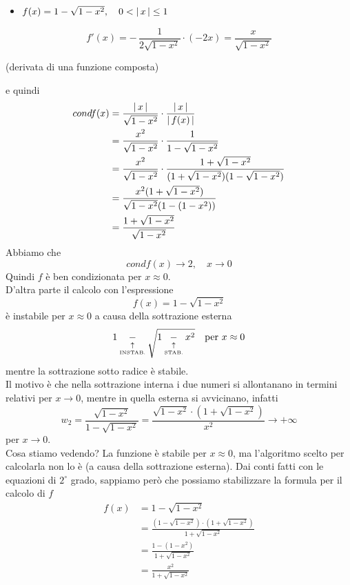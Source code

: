 \documentclass[12pt]{article}
\DeclarePairedDelimiter{\abs}{\lvert}{\rvert}
\begin{document}
\begin{itemize} %
    \item $f(x) = 1-\sqrt{1-x^2}, \quad 0 < \abs{\,x\,} \le 1$\\
\end{itemize}
\[ f'(x) = -\,\frac{1}{2\sqrt{1-x^2}} \cdot (-2x) = \frac{x}{\sqrt{1-x^2}} \]
\begin{center}
    (derivata di una funzione composta)
\end{center}
e quindi
\[ \begin{split}
        condf(x) & = \frac{\abs{\,x\,}}{\sqrt{1-x^2}} \cdot \frac{\abs{\,x\,}}{\abs{\,f(x)\,}} \\
        & = \frac{x^2}{\sqrt{1-x^2}} \cdot \frac{1}{1-\sqrt{1-x^2}} \\
        & = \frac{x^2}{\sqrt{1-x^2}}\cdot \frac{1 + \sqrt{1-x^2}}{(1 + \sqrt{1-x^2})(1 - \sqrt{1-x^2})}\\
        & = \frac{x^2(1+\sqrt{1-x^2})}{\sqrt{1-x^2}(1-(1-x^2))} \\
        & = \frac{1+\sqrt{1-x^2}}{\sqrt{1-x^2}} \\
    \end{split} \]
Abbiamo che
\[ condf(x)\rightarrow2, \quad x\rightarrow0 \]
Quindi $f$ è ben condizionata per $x\approx0$.\\ 
D'altra parte il calcolo con l'espressione
\[ f(x)=1-\sqrt{1-x^2} \]
è instabile per $x\approx 0$ a causa della sottrazione esterna 
\[1 \underset{\underset{\text{\tiny{INSTAB.}}}{\uparrow}}{-} \sqrt{1 \underset{\underset{\text{\tiny{STAB.}}}{\uparrow}}{-} x^2} \quad \text{per } x \approx 0\]
mentre la sottrazione sotto radice è stabile.\\
Il motivo è che nella sottrazione interna i due numeri si allontanano in termini relativi per $x \to 0$, mentre in quella esterna si avvicinano, infatti
\[ w_2 = \frac{\sqrt{1-x^2}}{1-\sqrt{1-x^2}} = \frac{\sqrt{1-x^2}\cdot (1+\sqrt{1-x^2})}{x^2} \to +\infty \]
per $x\to 0$.\\
Cosa stiamo vedendo? La funzione è stabile per $x\approx 0$, ma l'algoritmo scelto per calcolarla non lo è (a causa della sottrazione esterna). Dai conti fatti con le equazioni di $2^\circ$ grado, sappiamo però che possiamo stabilizzare la formula per il calcolo di $f$
\[ \begin{split}
    f(x) & = 1-\sqrt{1-x^2} \\
    & = \frac{(1-\sqrt{1-x^2}) \cdot (1+\sqrt{1-x^2})}{1+\sqrt{1-x^2}} \\
    & =\frac{1-(1-x^2)}{1+\sqrt{1-x^2}} \\
    & =\frac{x^2}{1+\sqrt{1-x^2}} 
\end{split} \]
\end{document}
